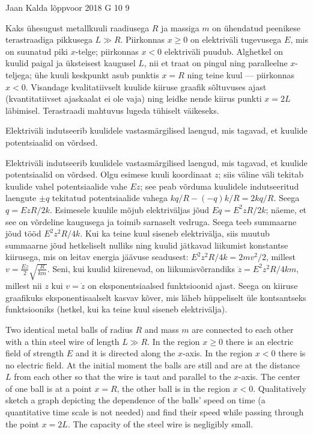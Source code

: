 {Jaan Kalda} %
{lõppvoor} %
{2018} %
{G 10} %
{9} %
{
\ifStatement
Kaks ühesugust metallkuuli raadiusega $R$ ja massiga $m$ on ühendatud peenikese terastraadiga pikkusega $L\gg R$. Piirkonnas $x\ge 0$ on elektriväli tugevusega $E$, mis on suunatud piki $x$-telge; piirkonnas $x< 0$ elektriväli puudub. Alghetkel on kuulid paigal ja üksteisest kaugusel $L$, nii et traat on pingul ning paralleelne $x$-teljega; ühe kuuli keskpunkt asub punktis $x=R$ ning teine kuul --- piirkonnas $x<0$. Visandage kvalitatiivselt kuulide kiiruse graafik sõltuvuses ajast (kvantitatiivset ajaskaalat ei ole vaja) ning leidke nende kiirus punkti $x=2L$ läbimisel. Terastraadi mahtuvus lugeda tühiselt väikeseks.
\fi


\ifHint
Elektriväli indutseerib kuulidele vastasmärgilised laengud, mis tagavad, et kuulide potentsiaalid on võrdsed.
\fi


\ifSolution
Elektriväli indutseerib kuulidele vastasmärgilised laengud, mis tagavad, et kuulide potentsiaalid on võrdsed. Olgu esimese kuuli koordinaat $z$; siis väline väli tekitab kuulide vahel potentsiaalide vahe $Ez$; see peab võrduma kuulidele indutseeritud laengute $\pm q$ tekitatud potentsiaalide vahega $kq/R-(-q)k/R=2kq/R$. Seega $q=EzR/2k$. Esimesele kuulile mõjub elektriväljas jõud $Eq=E^2zR/2k$; näeme, et see on võrdeline kaugusega ja toimib sarnaselt vedruga. Seega teeb summaarne jõud tööd $E^2z^2R/4k$. Kui ka teine kuul siseneb elektrivälja, siis muutub summaarne jõud hetkeliselt nulliks ning kuulid jätkavad liikumist konstantse kiirusega, mis on leitav energia jäävuse seadusest: $E^2z^2R/4k=2mv^2/2$, millest $v=\frac {Ez}{2}\sqrt{\frac{R}{km}}$. Seni, kui kuulid kiirenevad, on liikumisvõrrandiks $\ddot z=E^2z^2R/4km$, millest nii $z$ kui $v=\dot z$ on eksponentsiaalsed funktsioonid ajast. Seega on kiiruse graafikuks eksponentisaalselt kasvav kõver, mis läheb hüppeliselt üle kontsantseks funktsiooniks (hetkel, kui ka teine kuul siseneb elektrivälja).
\fi


\ifEngStatement
Two identical metal balls of radius $R$ and mass $m$ are connected to each other with a thin steel wire of length $L\gg R$. In the region $x\ge 0$ there is an electric field of strength $E$ and it is directed along the $x$-axis. In the region $x< 0$ there is no electric field. At the initial moment the balls are still and are at the distance $L$ from each other so that the wire is taut and parallel to the $x$-axis. The center of one ball is at a point $x=R$, the other ball is in the region $x<0$. Qualitatively sketch a graph depicting the dependence of the balls’ speed on time (a quantitative time scale is not needed) and find their speed while passing through the point $x=2L$. The capacity of the steel wire is negligibly small.
\fi


}
